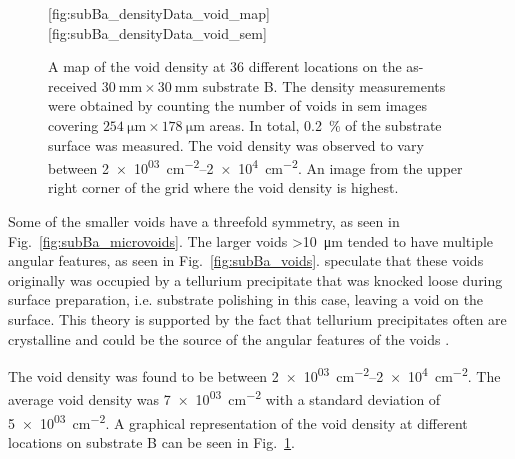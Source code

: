 \begin{figure}[htbp]
    \centering
        [fig:subBa_densityData_void_map]
        \hfill
        [fig:subBa_densityData_void_sem]
    \caption[Map of the void density on the as-received substrate B.]{ A map of the void density at 36 different locations on the as-received $\SI{30}{\milli\metre}\times\SI{30}{\milli\metre}$ substrate B. The density measurements were obtained by counting the number of voids in \ac{sem} images covering $\SI{254}{\micro\metre}\times\SI{178}{\micro\metre}$ areas. In total, \SI{0.2}{\percent} of the substrate surface was measured. The void density was observed to vary between \SIrange{2e+03}{2e+4}{\centi\metre^{-2}}.  An image from the upper right corner of the grid where the void density is highest.}
    \label{fig:subBa_densityData_voids}
\end{figure}

Some of the smaller voids have a threefold symmetry, as seen in Fig.~\ref{fig:subBa_microvoids}. The larger voids \SI{>10}{\micro\metre} tended to have multiple angular features, as seen in Fig.~\ref{fig:subBa_voids}. \citet{reddy2013cross} speculate that these voids originally was occupied by a tellurium precipitate that was knocked loose during surface preparation, i.e. substrate polishing in this case, leaving a void on the surface. This theory is supported by the fact that tellurium precipitates often are crystalline and could be the source of the angular features of the voids \citep{wang2008observation}.

The void density was found to be between \SIrange{2e+03}{2e+4}{\centi\metre^{-2}}. The average void density was \SI{7e+03}{\centi\metre^{-2}} with a standard deviation of \SI{5e+03}{\centi\metre^{-2}}. A graphical representation of the void density at different locations on substrate B can be seen in Fig.~\ref{fig:subBa_densityData_voids}.

